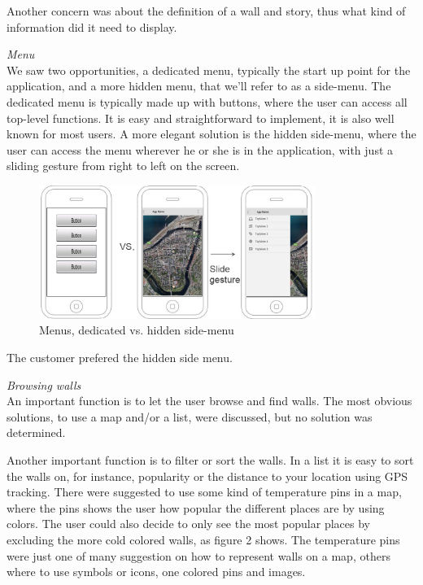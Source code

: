 \documentclass[11pt]{book}
\begin{document}
Another concern was about the definition of a wall and story, thus what kind of information did it need to display.

\textit{Menu}\\
We saw two opportunities, a dedicated menu, typically the start up point for the application, and a more hidden menu, that we’ll refer to as a side-menu. The dedicated menu is typically made up with buttons, where the user can access all top-level functions. It is easy and straightforward to implement, it is also well known for most users. A more elegant solution is the hidden side-menu, where the user can access the menu wherever he or she is in the application, with just a sliding gesture from right to left on the screen.

\begin{figure}[H]
      \centering
      \includegraphics[width=0.8\textwidth]{Figures/Phases/Sprint1/versiononeSliding.png}
      \caption{Menus, dedicated vs. hidden side-menu}
      \label{fig:phases_sprint1_uiVersionOneMenu}
\end{figure}

The customer prefered the hidden side menu.

\textit{Browsing walls}\\
An important function is to let the user browse and find walls. The most obvious solutions, to use a map and/or a list, were discussed, but no solution was determined. 

Another important function is to filter or sort the walls. In a list it is easy to sort the walls on, for instance, popularity or the distance to your location using GPS tracking. There were suggested to use some kind of temperature pins in a map, where the pins shows the user how popular the different places are by using colors. The user could also decide to only see the most popular places by excluding the more cold colored walls, as figure 2 shows. The temperature pins were just one of many suggestion on how to represent walls on a map, others where to use symbols or icons, one colored pins and images. 
\end{document}
